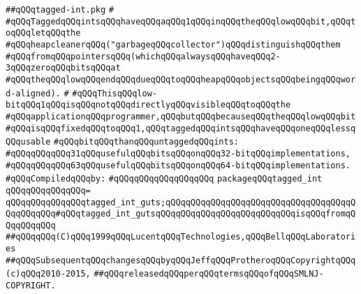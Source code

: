 \label{src/lib/std/tagged-int.pkg}
\verb|##qQQqtagged-int.pkg|\newline
\verb|#|\newline
\verb|#qQQqTaggedqQQqintsqQQqhaveqQQqaqQQq1qQQqinqQQqtheqQQqlowqQQqbit,qQQqtoqQQqletqQQqthe|\newline
\verb|#qQQqheapcleanerqQQq("garbageqQQqcollector")qQQqdistinguishqQQqthem|\newline
\verb|#qQQqfromqQQqpointersqQQq(whichqQQqalwaysqQQqhaveqQQq2-3qQQqzeroqQQqbitsqQQqat|\newline
\verb|#qQQqtheqQQqlowqQQqendqQQqdueqQQqtoqQQqheapqQQqobjectsqQQqbeingqQQqword-aligned).|\newline
\verb|#|\newline
\verb|#qQQqThisqQQqlow-bitqQQq1qQQqisqQQqnotqQQqdirectlyqQQqvisibleqQQqtoqQQqthe|\newline
\verb|#qQQqapplicationqQQqprogrammer,qQQqbutqQQqbecauseqQQqtheqQQqlowqQQqbit|\newline
\verb|#qQQqisqQQqfixedqQQqtoqQQq1,qQQqtaggedqQQqintsqQQqhaveqQQqoneqQQqlessqQQqusable|\newline
\verb|#qQQqbitqQQqthanqQQquntaggedqQQqints:|\newline
\verb|#qQQqqQQqqQQq31qQQqusefulqQQqbitsqQQqonqQQq32-bitqQQqimplementations,|\newline
\verb|#qQQqqQQqqQQq63qQQqusefulqQQqbitsqQQqonqQQq64-bitqQQqimplementations.|\newline
\newline
\verb|#qQQqCompiledqQQqby:|\newline
\verb|#qQQqqQQqqQQqqQQqqQQq|\newline
\newline
\verb|packageqQQqtagged_int|\newline
\verb|qQQqqQQqqQQqqQQq=|\newline
\verb|qQQqqQQqqQQqqQQqtagged_int_guts;qQQqqQQqqQQqqQQqqQQqqQQqqQQqqQQqqQQqqQQqqQQqqQQq#qQQqtagged_int_gutsqQQqqQQqqQQqqQQqqQQqqQQqqQQqisqQQqfromqQQqqQQqqQQq|\newline
\newline
\newline
\newline
\verb|##qQQqqQQq(C)qQQq1999qQQqLucentqQQqTechnologies,qQQqBellqQQqLaboratories|\newline
\verb|##qQQqSubsequentqQQqchangesqQQqbyqQQqJeffqQQqProtheroqQQqCopyrightqQQq(c)qQQq2010-2015,|\newline
\verb|##qQQqreleasedqQQqperqQQqtermsqQQqofqQQqSMLNJ-COPYRIGHT.|\newline

